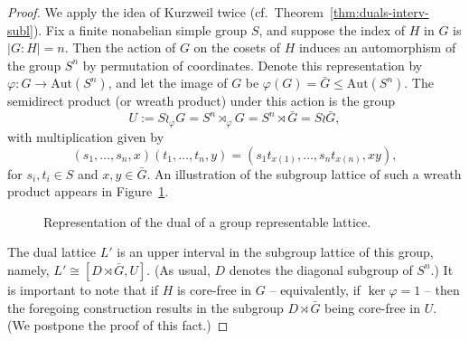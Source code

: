 \documentclass[cm,dissertation]{uhthesis}
\theoremstyle{plain}
\theoremstyle{definition}
\theoremstyle{remark}
\numberwithin{theorem}{section}
\numberwithin{claim}{chapter}
\numberwithin{equation}{section}
\numberwithin{conjecture}{chapter}
\newcommand{\<}{\ensuremath{\langle}}
\renewcommand{\>}{\ensuremath{\rangle}}
\renewcommand{\leq}{\ensuremath{\leqslant}}
\newcommand{\Aut}{\ensuremath{\mathrm{Aut}}}
\newcommand{\Eq}{\ensuremath{\mathrm{Eq}}}
\newcommand{\0}{\ensuremath{\mathbf{0}}}
\newcommand{\1}{\ensuremath{\mathbf{1}}}
\newcommand{\2}{\ensuremath{\mathbf{2}}}
\newcommand{\3}{\ensuremath{\mathbf{3}}}
\newcommand{\4}{\ensuremath{\mathbf{4}}}
\newcommand{\5}{\ensuremath{\mathbf{5}}}
\renewcommand{\phi}{\ensuremath{\varphi}}
\begin{document}
\begin{proof}
  We apply the idea of Kurzweil twice
  (cf.~Theorem~\ref{thm:duals-interv-subl}).  Fix a finite nonabelian simple
  group $S$, and suppose the index of $H$ in $G$ is $|G:H| = n$.
  Then the action of $G$ on the cosets of $H$ induces an automorphism of the
  group $S^n$ by permutation of coordinates.  Denote this representation by
  $\phi: G \rightarrow \Aut(S^n)$, 
  and let the image of $G$ be $\phi(G) =
  \bar{G} \leq \Aut(S^n)$.  
%
  The semidirect product (or wreath product) under this action is the group
  \[
  U:= S\wr_\phi G = S^n \rtimes_\phi G = S^n \rtimes \bar{G} =  S\wr \bar{G},
  \]
  with multiplication given by
  \[
  (s_1, \dots, s_n, x) (t_1, \dots, t_n, y) = 
  (s_1 t_{x(1)}, \dots, s_nt_{x(n)}, x y),
  \]
  for $s_i, t_i \in S$ and $x, y \in \bar{G}$.
  An illustration of the subgroup lattice of such a wreath product appears in Figure~\ref{fig:kurzweil}.
  \begin{figure}[!h]
\begin{center}
\end{center}
    \caption{Representation of the dual of a group representable lattice.}
    \label{fig:kurzweil}
  \end{figure}
  The dual lattice $L'$ is an upper interval in the subgroup lattice of this group, namely,
  $L'\cong [D\rtimes \bar{G}, U]$.
  (As usual, $D$ denotes the diagonal subgroup of $S^n$.)  It is important to
  note that if $H$ is core-free in $G$ -- equivalently, if $\ker \phi = 1$
  -- then the foregoing construction results in the subgroup $D\rtimes \bar{G}$ being
  core-free in $U$.   (We postpone the proof of this fact.)


\end{proof}
\end{document}

